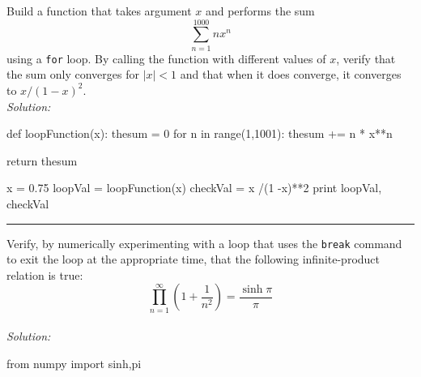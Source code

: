 \begin{enumerate}
    \prob Build a function that takes argument $x$ and performs the sum
    \[
        \sum_{n=1}^{1000} n x^n
    \]
    using a {\tt for} loop.  By calling the function with different
    values of $x$, verify that the sum only converges for $|x| < 1$
    and that when it does converge, it converges to $x/(1-x)^2$.\\
\ifsolutions
\textit{Solution:}\\
\begin{codeexample}
\begin{VerbatimOut}{\listingFile}
def loopFunction(x):
    thesum = 0
    for n in range(1,1001):
        thesum += n * x**n 

    return thesum

x = 0.75
loopVal = loopFunction(x)
checkVal = x /(1 -x)**2
print loopVal, checkVal
\end{VerbatimOut}
\end{codeexample}
\else
\noindent\rule{5 in}{0.01 in}
\fi

%
%


\prob Verify, by numerically experimenting with a 
    loop that uses the {\tt break} command to
    exit the loop at the appropriate time, that the
    following infinite-product relation is true:
    \[
        \prod_{n=1}^{\infty} \left( 1 + \frac{1}{n^2} \right)
        = \frac{ \sinh{\pi} }{ \pi }
    \]\\
\ifsolutions
\textit{Solution:}\\
\begin{codeexample}
\begin{VerbatimOut}{\listingFile}
from numpy import sinh,pi


\end{VerbatimOut}
\end{codeexample}
\end{enumerate}

